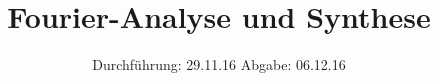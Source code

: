 

\subject{V351}
\title{Fourier-Analyse und Synthese}
\date{
  Durchführung: 29.11.16
  \hspace{3em}
  Abgabe: 06.12.16
}



\maketitle
\newpage






\printbibliography



